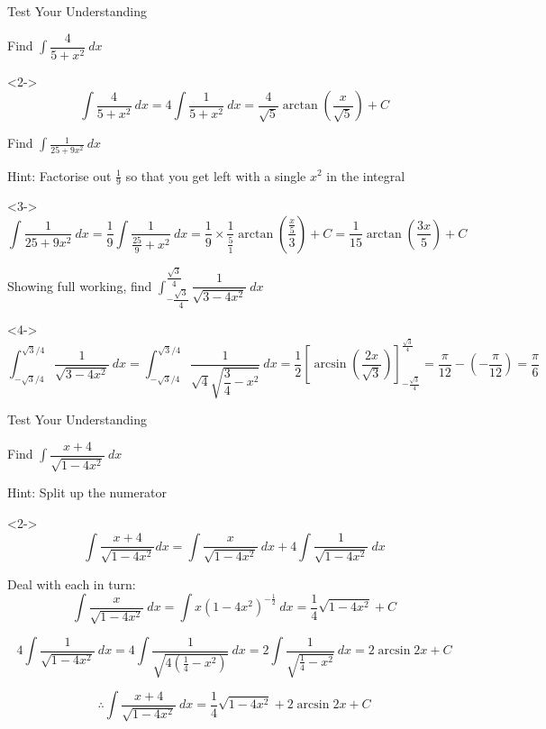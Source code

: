 \documentclass[8pt]{beamer}
\begin{document}
	\begin{frame}[shrink]{Test Your Understanding}
		\begin{problem}
			Find $\int \dfrac{4}{5+x^{2}}\ dx$
		\end{problem}
		\begin{solution}<2->
			\[ \int \frac{4}{5+x^{2}}\ dx = 4 \int \frac{1}{5+x^{2}}\ dx=\frac{4}{\sqrt{5}}\arctan \left( \frac{x}{\sqrt{5}}\right) +C \]
		\end{solution}
		
		\begin{problem}
			Find $\int \frac{1}{25+9x^{2}}\ dx$
		\end{problem}
		\alert{Hint: Factorise out $\frac{1}{9}$ so that you get left with a single $x^{2}$ in the integral}
		\begin{solution}<3->
			\[\int \frac{1}{25+9x^{2}}\ dx=\frac{1}{9}\int \frac{1}{\frac{25}{9}+x^{2}}\ dx=\frac{1}{9}\times \frac{1}{\frac{5}{1}}\arctan \left( \frac{\frac{x}{5}}{3}\right) +C=\frac{1}{15}\arctan \left( \frac{3x}{5}\right) +C\]
		\end{solution}
		
		\begin{problem}
			Showing full working, find $\int ^{\dfrac{\sqrt{3}}{4}}_{-\dfrac{\sqrt{3}}{4}}\dfrac{1}{\sqrt{3-4x^{2}}}\ dx$
		\end{problem}
		\begin{solution}<4->
			\[\int ^{\sqrt{3}/4}_{-\sqrt{3}/4}\dfrac{1}{\sqrt{3-4x^{2}}}\ dx=\int ^{\sqrt{3}/{4}}_{-\sqrt{3}/{4}} \dfrac{1}{\sqrt{4}\sqrt{\dfrac{3}{4}-x^{2}}}\ dx=\dfrac{1}{2}\left[ \arcsin \left( \dfrac{2x}{\sqrt{3}}\right) \right] _{-\frac{\sqrt{3}}{4}}^{\frac{\sqrt{3}}{4}}=\frac{\pi }{12}-\left( -\frac{\pi }{12}\right) =\frac{\pi }{6}\]
		\end{solution}
	\end{frame}
	
	\begin{frame}[shrink]{Test Your Understanding}
		
		\begin{problem}
			Find $\int \dfrac{x+4}{\sqrt{1-4x^{2}}}\ dx$
		\end{problem}
		\alert{Hint: Split up the numerator}
		\begin{solution}<2->
			\[\int \frac{x+4}{\sqrt{1-4x^{2}}}dx = \int \frac{x}{\sqrt{1-4x^{2}}}\ dx+4\int \frac{1}{\sqrt{1-4x^{2}}}\ dx \]
			
			Deal with each in turn:
			\[ \int \frac{x}{\sqrt{1-4x^{2}}}\ dx = \int x\left( 1-4x^{2}\right) ^{-\frac{1}{2}}\ dx=\frac{1}{4}\sqrt{1-4x^{2}}+C \]
			
			\[ 4\int \frac{1}{\sqrt{1-4x^{2}}}\ dx = 4\int \frac{1}{\sqrt{ 4( \frac{1}{4}-x^{2}) }}\ dx=2\int \frac{1}{\sqrt{\frac{1}{4}-x^{2}}}\ dx=2\arcsin 2x+C \]
			
			\[ \therefore \int \frac{x+4}{\sqrt{1-4x^{2}}}\ dx = \frac{1}{4}\sqrt{1-4x^{2}}+2\arcsin 2x+C\]
		\end{solution}
		
	\end{frame}
	
\end{document}
